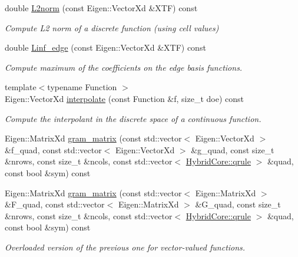 \begin{DoxyCompactItemize}
double \hyperlink{classHCore2D_1_1HybridCore_a4571fff91492781ebb01849b1063e626}{L2norm} (const Eigen\+::\+Vector\+Xd \&X\+TF) const
\begin{DoxyCompactList}\small\item\em Compute L2 norm of a discrete function (using cell values) \end{DoxyCompactList}\item 
\mbox{\label{classHCore2D_1_1HybridCore_a881165aafe7583d9ba7c8c2dfa0de758}} 
double \hyperlink{classHCore2D_1_1HybridCore_a881165aafe7583d9ba7c8c2dfa0de758}{Linf\+\_\+edge} (const Eigen\+::\+Vector\+Xd \&X\+TF) const
\begin{DoxyCompactList}\small\item\em Compute maximum of the coefficients on the edge basis functions. \end{DoxyCompactList}\item 
{\footnotesize template$<$typename Function $>$ }\\Eigen\+::\+Vector\+Xd \hyperlink{group__HybridCore2D_ga38fd6d5675a95b778e5b254d1b09d0f8}{interpolate} (const Function \&f, size\+\_\+t doe) const
\begin{DoxyCompactList}\small\item\em Compute the interpolant in the discrete space of a continuous function. \end{DoxyCompactList}\item 
Eigen\+::\+Matrix\+Xd \hyperlink{classHCore2D_1_1HybridCore_afb723bb5038c74bc2ddb9da3fc3b6c0e}{gram\+\_\+matrix} (const std\+::vector$<$ Eigen\+::\+Vector\+Xd $>$ \&f\+\_\+quad, const std\+::vector$<$ Eigen\+::\+Vector\+Xd $>$ \&g\+\_\+quad, const size\+\_\+t \&nrows, const size\+\_\+t \&ncols, const std\+::vector$<$ \hyperlink{structHCore2D_1_1HybridCore_1_1qrule}{Hybrid\+Core\+::qrule} $>$ \&quad, const bool \&sym) const
\item 
Eigen\+::\+Matrix\+Xd \hyperlink{classHCore2D_1_1HybridCore_ad9a88581a758d6522f1f3d0fbf302169}{gram\+\_\+matrix} (const std\+::vector$<$ Eigen\+::\+Matrix\+Xd $>$ \&F\+\_\+quad, const std\+::vector$<$ Eigen\+::\+Matrix\+Xd $>$ \&G\+\_\+quad, const size\+\_\+t \&nrows, const size\+\_\+t \&ncols, const std\+::vector$<$ \hyperlink{structHCore2D_1_1HybridCore_1_1qrule}{Hybrid\+Core\+::qrule} $>$ \&quad, const bool \&sym) const
\begin{DoxyCompactList}\small\item\em Overloaded version of the previous one for vector-\/valued functions. \end{DoxyCompactList}\item 

\end{DoxyCompactItemize}
